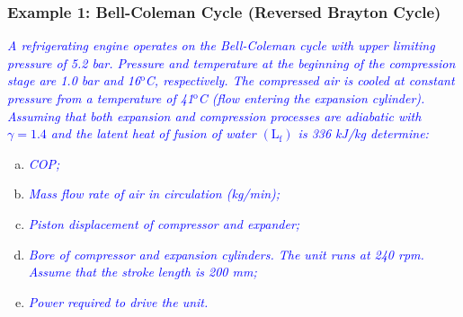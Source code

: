 \documentclass[10pt,compress]{beamer}
\begin{document}
\begin{frame}
 \frametitle{Example 1: Bell-Coleman Cycle (Reversed Brayton Cycle)}
\textcolor{blue}{{\it A refrigerating engine operates on the Bell-Coleman cycle with upper limiting pressure of 5.2 bar. Pressure and temperature at the beginning of the compression stage are 1.0 bar and 16$^{\text{o}}$C, respectively. The compressed air is cooled at constant pressure from a temperature of 41$^{\text{o}}$C  (flow entering the expansion cylinder). Assuming that both expansion and compression processes are adiabatic with $\gamma=1.4$ and the latent heat of fusion of water $\left(\text{L}_{\text{f}}\right)$ is 336 kJ/kg determine:}}

\begin{enumerate}[(a)]
\item \textcolor{blue}{{\it COP;}}
\item \textcolor{blue}{{\it Mass flow rate of air in circulation (kg/min);}}
\item \textcolor{blue}{{\it Piston displacement of compressor and expander;}}
\item \textcolor{blue}{{\it Bore of compressor and expansion cylinders. The unit runs at 240 rpm. Assume that the stroke length is 200 mm;}}
\item \textcolor{blue}{{\it Power required to drive the unit.}}
\end{enumerate}

\end{frame}
\end{document}
